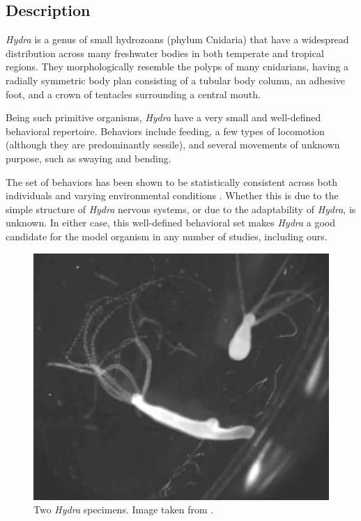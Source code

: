\documentclass{article}
\begin{document}
\subsection{Description}
\label{subsection:description}
\textit{Hydra} is a genus of small hydrozoans (phylum Cnidaria) that have a widespread distribution across many freshwater bodies in both temperate and tropical regions. They morphologically resemble the polyps of many cnidarians, having a radially symmetric body plan consisting of a tubular body column, an adhesive foot, and a crown of tentacles surrounding a central mouth.

Being such primitive organisms, \textit{Hydra} have a very small and well-defined behavioral repertoire. Behaviors include feeding, a few types of locomotion (although they are predominantly sessile), and several movements of unknown purpose, such as swaying and bending.

The set of behaviors has been shown to be statistically consistent across both individuals and varying environmental conditions \cite{behavior}. Whether this is due to the simple structure of \textit{Hydra} nervous systems, or due to the adaptability of \textit{Hydra}, is unknown. In either case, this well-defined behavioral set makes \textit{Hydra} a good candidate for the model organism in any number of studies, including ours.

\begin{figure}[!htb]
    \centering
    \includegraphics[scale=0.35]{final_paper/hydra.jpg}
    \caption{Two \textit{Hydra} specimens. Image taken from \cite{behavior}.}
    \label{fig:hydra}
\end{figure}
\end{document}
